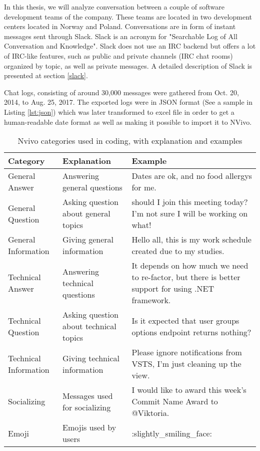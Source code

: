 In this thesis, we will analyze conversation between a couple of software development teams of the company. These teams are located in two development centers located in Norway and Poland. Conversations are in form of instant messages sent through Slack. Slack is an acronym for "Searchable Log of All Conversation and Knowledge". Slack does not use an IRC backend but offers a lot of IRC-like features, such as public and private channels (IRC chat rooms) organized by topic, as well as private messages. A detailed description of Slack is presented at section \ref{slack}.

Chat logs, consisting of around 30,000 messages were gathered from Oct. 20, 2014, to Aug. 25, 2017. The exported logs were in JSON format (See a sample in Listing \ref{lst:json}) which was later transformed to excel file in order to get a human-readable date format as well as making it possible to import it to NVivo.




\begin{table}
\centering
\caption{Nvivo categories used in coding, with explanation and examples}
\label{tab:nvivo}
\begin{tabular}{|l|p{3.5cm}|p{5cm}|}
\hline
\textbf{Category} & \textbf{Explanation} & \textbf{Example}\\ \hline
\hline
General Answer & Answering general questions & Dates are ok, and no food allergys for me.\\ \hline
General Question & Asking question about general topics &  should I join this meeting today? I'm not sure I will be working on what!\\ \hline
General Information & Giving general information & Hello all, this is my work schedule created due to my studies.\\ \hline
Technical Answer & Answering technical questions & It depends on how much we need to re-factor, but there is better support for using .NET framework.\\ \hline
Technical Question & Asking question about technical topics & Is it expected that user groups options endpoint returns nothing?\\ \hline
Technical Information & Giving technical information & Please ignore notifications from VSTS, I'm just cleaning up the view.\\ \hline
Socializing & Messages used for socializing & I would like to award this week’s Commit Name Award to @Viktoria.\\ \hline
Emoji & Emojis used by users & :slightly\_smiling\_face: \\
\hline
\end{tabular}
\end{table}


